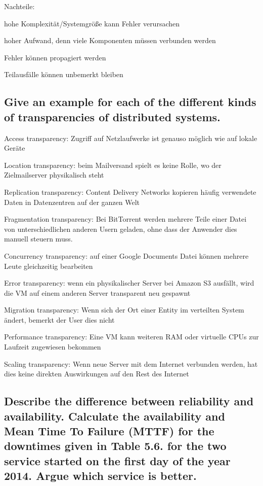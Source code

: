 \documentclass[a4paper,
			llpt,
			solution,
			accentcolor=tud2d,
			colorbacktitle
			]
			{tudexercise}
\begin{document}
Nachteile:
\begin{compactitem}
	\item hohe Komplexität/Systemgröße kann Fehler verursachen
	\item hoher Aufwand, denn viele Komponenten müssen verbunden werden
	\item Fehler können propagiert werden
	\item Teilausfälle können unbemerkt bleiben
\end{compactitem}

\subsection{Give an example for each of the different kinds of transparencies of distributed systems.}
\begin{compactitem}
	\item Access transparency: Zugriff auf Netzlaufwerke ist genauso möglich wie auf lokale Geräte
	\item Location transparency: beim Mailversand spielt es keine Rolle, wo der Zielmailserver physikalisch steht
	\item Replication transparency: Content Delivery Networks kopieren häufig verwendete Daten in Datenzentren auf der ganzen Welt
	\item Fragmentation transparency: Bei BitTorrent werden mehrere Teile einer Datei von unterschiedlichen anderen Usern geladen, ohne dass der Anwender dies manuell steuern muss.
	\item Concurrency transparency: auf einer Google Documents Datei können mehrere Leute gleichzeitig bearbeiten
	\item Error transparency: wenn ein physikalischer Server bei Amazon S3 ausfällt, wird die VM auf einem anderen Server transparent neu gespawnt
	\item Migration transparency: Wenn sich der Ort einer Entity im verteilten System ändert, bemerkt der User dies nicht
	\item Performance transparency: Eine VM kann weiteren RAM oder virtuelle CPUs zur Laufzeit zugewiesen bekommen
	\item Scaling transparency: Wenn neue Server mit dem Internet verbunden werden, hat dies keine direkten Auswirkungen auf den Rest des Internet
\end{compactitem}


\subsection{Describe the difference between reliability and availability. Calculate the availability and Mean Time To Failure (MTTF) for the downtimes given in Table 5.6. for the two service started on the first day of the year 2014. Argue which service is better.}
\end{document}
